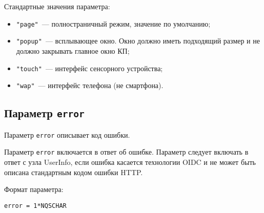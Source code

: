 Стандартные значения параметра:
%
\begin{itemize}
\item
\lstinline{"page"}~--- полностраничный режим, значение по умолчанию;

\item
\lstinline{"popup"}~--- 
всплывающее окно. Окно должно иметь подходящий размер и не должно 
закрывать главное окно КП;

\item
\lstinline{"touch"}~---
интерфейс сенсорного устройства;

\item
\lstinline{"wap"}~---
интерфейс  телефона (не смартфона).
\end{itemize}

\subsection{Параметр \lstinline{error}}\label{PARAMS.Error}

Параметр \lstinline{error} описывает код ошибки.

Параметр \lstinline{error} включается в ответ об ошибке.
%
Параметр следует включать в ответ с узла UserInfo, если ошибка касается 
технологии OIDC и не может быть описана стандартным кодом ошибки HTTP.

Формат параметра:
\begin{lstlisting}
error = 1*NQSCHAR
\end{lstlisting}


